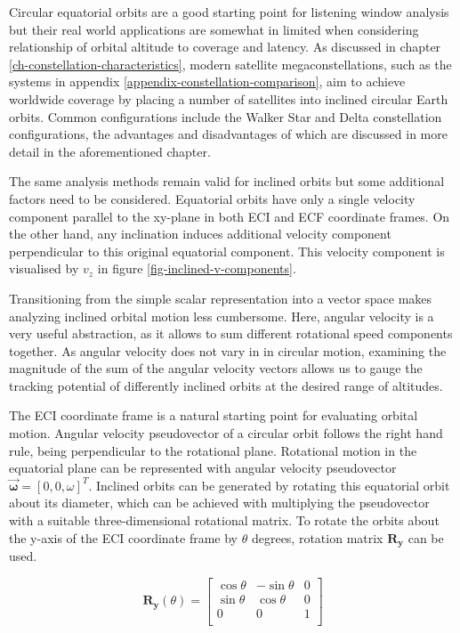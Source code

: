 \documentclass[english, 12pt, a4paper, elec, utf8, a-1b, online]{aaltothesis}
\begin{document}
Circular equatorial orbits are a good starting point for listening window analysis but their real world applications are somewhat in limited when considering relationship of orbital altitude to coverage and latency.
As discussed in chapter \ref{ch-constellation-characteristics}, modern satellite megaconstellations, such as the systems in appendix \ref{appendix-constellation-comparison}, aim to achieve worldwide coverage by placing a number of satellites into inclined circular Earth orbits.
Common configurations include the Walker Star and Delta constellation configurations, the advantages and disadvantages of which are discussed in more detail in the aforementioned chapter.

The same analysis methods remain valid for inclined orbits but some additional factors need to be considered.
Equatorial orbits have only a single velocity component parallel to the xy-plane in both ECI and ECF coordinate frames.
On the other hand, any inclination induces additional velocity component perpendicular to this original equatorial component.
This velocity component is visualised by $v_z$ in figure \ref{fig-inclined-v-components}. %

Transitioning from the simple scalar representation into a vector space makes analyzing inclined orbital motion less cumbersome.
Here, angular velocity is a very useful abstraction, as it allows to sum different rotational speed components together.
As angular velocity does not vary in in circular motion, examining the magnitude of the sum of the angular velocity vectors allows us to gauge the tracking potential of differently inclined orbits at the desired range of altitudes.

The ECI coordinate frame is a natural starting point for evaluating orbital motion.
Angular velocity pseudovector of a circular orbit follows the right hand rule, being perpendicular to the rotational plane.
Rotational motion in the equatorial plane can be represented with angular velocity pseudovector $\bm{\vec{\omega}} = [0,0,\omega]^T$.
Inclined orbits can be generated by rotating this equatorial orbit about its diameter, which can be achieved with multiplying the pseudovector with a suitable three-dimensional rotational matrix.
To rotate the orbits about the y-axis of the ECI coordinate frame by $\theta$ degrees, rotation matrix $\bm{R_y}$ can be used.

\begin{equation*}
  \bm{R_y}(\theta) = \begin{bmatrix}
    \cos \theta & -\sin \theta & 0 \\[3pt]
    \sin \theta &  \cos \theta & 0 \\[3pt]
    0           &  0           & 1 \\
    \end{bmatrix}
\end{equation*}
\end{document}
